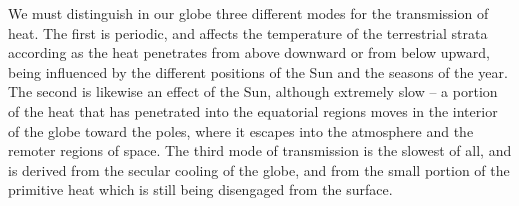 We must distinguish in our globe three different modes for the transmission of heat. The first is periodic, and affects the temperature of the terrestrial strata according as the heat penetrates from above downward or from below upward, being influenced by the different positions of the Sun and the seasons of the year. The second is likewise an effect of the Sun, although extremely slow -- a portion of the heat that has penetrated into the equatorial regions moves in the interior of the globe toward the poles, where it escapes into the atmosphere and the remoter regions of space. The third mode of transmission is the slowest of all, and is derived from the secular cooling of the globe, and from the small portion of the primitive heat which is still being disengaged from the surface.
    